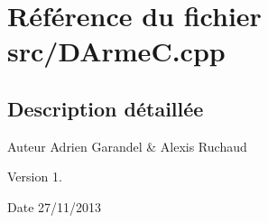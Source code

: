\section{Référence du fichier src/\-D\-Arme\-C.cpp}
\label{_d_arme_c_8cpp}


\subsection{Description détaillée}
\begin{DoxyAuthor}{Auteur}
Adrien Garandel \& Alexis Ruchaud 
\end{DoxyAuthor}
\begin{DoxyVersion}{Version}
1. 
\end{DoxyVersion}
\begin{DoxyDate}{Date}
27/11/2013 
\end{DoxyDate}
